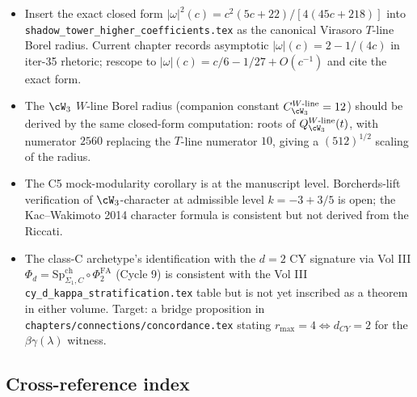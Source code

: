 \begin{itemize}
\item Insert the exact closed form $|\omega|^2(c) = c^2(5c+22)/
  [4(45c + 218)]$ into
  \texttt{shadow\_tower\_higher\_coefficients.tex} as the
  canonical Virasoro $T$-line Borel radius. Current chapter records
  asymptotic $|\omega|(c) = 2 - 1/(4c)$ in iter-35 rhetoric; rescope
  to $|\omega|(c) = c/6 - 1/27 + O(c^{-1})$ and cite the exact form.
\item The $\cW_3$ $W$-line Borel radius
  (companion constant $C^{W\text{-line}}_{\cW_3} = 12$) should be
  derived by the same closed-form computation: roots of
  $Q^{W\text{-line}}_{\cW_3}(t)$, with numerator $2560$ replacing
  the $T$-line numerator $10$, giving a $(512)^{1/2}$ scaling of
  the radius.
\item The C5 mock-modularity corollary is \texttt{\ClaimStatusConjectured}
  at the manuscript level. Borcherds-lift verification of
  $\cW_3$-character at admissible level $k = -3 + 3/5$ is open; the
  Kac--Wakimoto 2014 character formula is consistent but not
  derived from the Riccati.
\item The class-C archetype's identification with the $d = 2$ CY
  signature via Vol III $\Phi_d = \mathrm{Sp}^{\mathrm{ch}}_{\Sigma_1, C}
  \circ \Phi^{\mathrm{FA}}_2$ (Cycle 9) is consistent with the
  Vol III \texttt{cy\_d\_kappa\_stratification.tex} table but is
  not yet inscribed as a theorem in either volume. Target: a
  bridge proposition in \texttt{chapters/connections/concordance.tex}
  stating $r_{\max} = 4 \Leftrightarrow d_{CY} = 2$ for the
  $\beta\gamma(\lambda)$ witness.
\end{itemize}

\subsection*{Cross-reference index}

